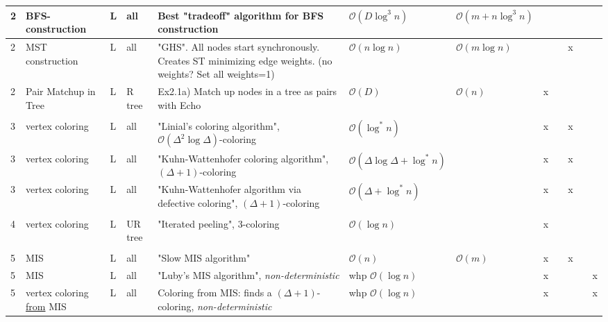\documentclass{article}
\begin{document}
\begin{table}
\begin{tabular}{@{}p{3mm}|p{30mm}|p{2mm}|p{13mm}|p{117mm}|p{30mm}|p{25mm}|p{2mm}|p{2mm}|p{2mm}|p{2mm}|p{3mm}}
	2 & BFS-construction & L & all & Best "tradeoff" algorithm for BFS construction & $\mathcal{O}(D\log^3 n)$ & $\mathcal{O}(m + n\log^3 n)$ &  &  &  &  & \\ 
	\hline 
	
	2 & MST construction & L & all & "GHS". All nodes start synchronously. Creates ST minimizing edge weights. (no weights? Set all weights=1) & $\mathcal{O}(n\log n)$ & $\mathcal{O}(m \log n)$ &  &  & x &  & \\ 
	\hline 
	
	2 & Pair Matchup in Tree & L & R tree & Ex2.1a) Match up nodes in a tree as pairs with Echo & $\mathcal{O}(D)$ & $\mathcal{O}(n)$ & x &  &  &  &  \\ 
	\hline 
	
	&  &  &  &  &  &  &  &  &  &  &  \\ 
	\hline 
	
	3 & vertex coloring & L & all & "Linial's coloring algorithm", $\mathcal{O}(\Delta^2 \log \Delta)$-coloring & $\mathcal{O}(\log^* n)$ &  & x &  & x &  &  \\ 
	\hline 
	
	3 & vertex coloring & L & all & "Kuhn-Wattenhofer coloring algorithm", $(\Delta + 1)$-coloring & $\mathcal{O}(\Delta \log \Delta + \log^* n)$ &  & x &  & x &  &  \\ 
	\hline
	
	3 & vertex coloring & L & all & "Kuhn-Wattenhofer algorithm via defective coloring", $(\Delta + 1)$-coloring & $\mathcal{O}(\Delta + \log^* n)$ &  & x &  & x &  &  \\ 
	\hline
	
	&  &  &  &  &  &  &  &  &  &  &  \\ 
	\hline 
	
	4 & vertex coloring & L & UR tree & "Iterated peeling", 3-coloring & $\mathcal{O}(\log n)$ &  & x &  &  &  &  \\ 
	\hline 
	
	&  &  &  &  &  &  &  &  &  &  &  \\ 
	\hline 
	
	5 & MIS & L & all & "Slow MIS algorithm" & $\mathcal{O}(n)$ & $\mathcal{O}(m)$ & x &  & x &  &  \\ 
	\hline 
	
	5 & MIS & L & all & "Luby's MIS algorithm", \textit{non-deterministic} & whp $\mathcal{O}(\log n)$ &  & x &  &  &  & x \\ 
	\hline 
	
	5 & vertex coloring \underline{from} MIS & L & all & Coloring from MIS: finds a $(\Delta + 1)$-coloring, \textit{non-deterministic} & whp $\mathcal{O}(\log n)$ &  & x &  &  &  & x \\ 
	\hline 
	

\end{tabular}
\end{table}
\end{document}
